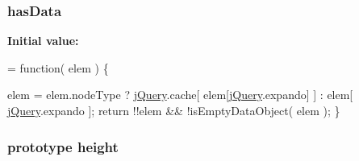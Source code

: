 \subsubsection[{has\+Data}]{ has\+Data}\label{jquery-1_810_82-vsdoc_8js_ae295a27c2f07b73f73ec6e43b4a0eb88}
{\bfseries Initial value\+:}
\begin{DoxyCode}
= \textcolor{keyword}{function}( elem ) \{


        elem = elem.nodeType ? \hyperlink{jquery-1_810_82-vsdoc_8js_add5237586d970a38a81f990e8eb28c6c}{jQuery}.cache[ elem[\hyperlink{jquery-1_810_82-vsdoc_8js_add5237586d970a38a81f990e8eb28c6c}{jQuery}.expando] ] : elem[ 
      \hyperlink{jquery-1_810_82-vsdoc_8js_add5237586d970a38a81f990e8eb28c6c}{jQuery}.expando ];
        \textcolor{keywordflow}{return} !!elem && !isEmptyDataObject( elem );
    \}
\end{DoxyCode}
\hypertarget{jquery-1_810_82-vsdoc_8js_ac05c0989a60ed0912fa475cb09c11162}{}
\subsubsection[{height}]{ {\bf prototype} height}\label{jquery-1_810_82-vsdoc_8js_ac05c0989a60ed0912fa475cb09c11162}
\hypertarget{jquery-1_810_82-vsdoc_8js_ab184a969b4c8542290dae744d90fd4d2}{}
